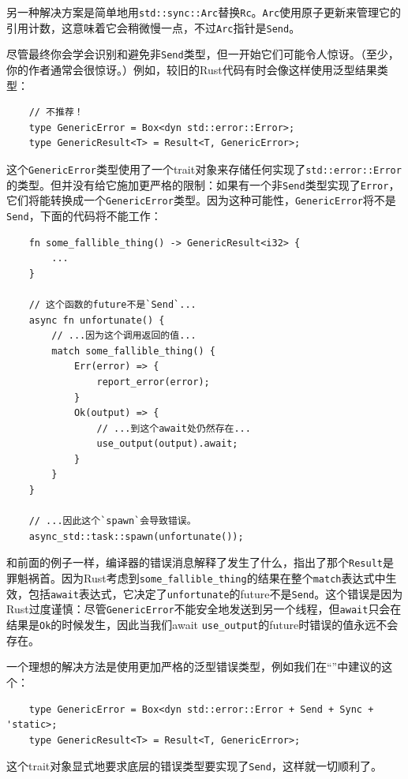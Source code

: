 另一种解决方案是简单地用\texttt{std::sync::Arc}替换\texttt{Rc}。\texttt{Arc}使用原子更新来管理它的引用计数，这意味着它会稍微慢一点，不过\texttt{Arc}指针是\texttt{Send}。

尽管最终你会学会识别和避免非\texttt{Send}类型，但一开始它们可能令人惊讶。（至少，你的作者通常会很惊讶。）例如，较旧的Rust代码有时会像这样使用泛型结果类型：
\begin{verbatim}
    // 不推荐！
    type GenericError = Box<dyn std::error::Error>;
    type GenericResult<T> = Result<T, GenericError>;
\end{verbatim}

这个\texttt{GenericError}类型使用了一个trait对象来存储任何实现了\texttt{std::error::Error}的类型。但并没有给它施加更严格的限制：如果有一个非\texttt{Send}类型实现了\texttt{Error}，它们将能转换成一个\texttt{GenericError}类型。因为这种可能性，\texttt{GenericError}将不是\texttt{Send}，下面的代码将不能工作：
\begin{verbatim}
    fn some_fallible_thing() -> GenericResult<i32> {
        ...
    }

    // 这个函数的future不是`Send`...
    async fn unfortunate() {
        // ...因为这个调用返回的值...
        match some_fallible_thing() {
            Err(error) => {
                report_error(error);
            }
            Ok(output) => {
                // ...到这个await处仍然存在...
                use_output(output).await;
            }
        }
    }

    // ...因此这个`spawn`会导致错误。
    async_std::task::spawn(unfortunate());
\end{verbatim}

和前面的例子一样，编译器的错误消息解释了发生了什么，指出了那个\texttt{Result}是罪魁祸首。因为Rust考虑到\texttt{some\_fallible\_thing}的结果在整个\texttt{match}表达式中生效，包括\texttt{await}表达式，它决定了\texttt{unfortunate}的future不是\texttt{Send}。这个错误是因为Rust过度谨慎：尽管\texttt{GenericError}不能安全地发送到另一个线程，但\texttt{await}只会在结果是\texttt{Ok}的时候发生，因此当我们await \texttt{use\_output}的future时错误的值永远不会存在。

一个理想的解决方法是使用更加严格的泛型错误类型，例如我们在“”中建议的这个：
\begin{verbatim}
    type GenericError = Box<dyn std::error::Error + Send + Sync + 'static>;
    type GenericResult<T> = Result<T, GenericError>;
\end{verbatim}

这个trait对象显式地要求底层的错误类型要实现了\texttt{Send}，这样就一切顺利了。

